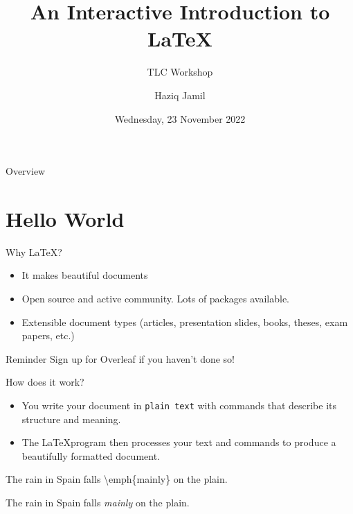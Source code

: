 \documentclass[,aspectratio=43]{beamer}
\author{Haziq Jamil}
\title{An Interactive Introduction to \LaTeX}
\subtitle{TLC Workshop}
\institute{Mathematical Sciences, Faculty of Science, UBD\\
\url{https://haziqj.ml}}
\date{Wednesday, 23 November 2022}
\newenvironment{Shaded}{\begin{snugshade}}{\end{snugshade}}
\newcommand{\FunctionTok}[1]{\textcolor[rgb]{0.02,0.16,0.49}{#1}}
\newcommand{\NormalTok}[1]{#1}
\begin{document}
\begin{frame}
	\titlepage
\end{frame}

\begin{frame}[allowframebreaks=0.8]{Overview}
    \begin{multicols}{2}
  \tableofcontents
  \end{multicols}
  \end{frame}


\hypertarget{hello-world}{%
\section{Hello World}\label{hello-world}}

\begin{frame}{Why \LaTeX?}
\protect\hypertarget{why}{}
\begin{itemize}
\item
  It makes beautiful documents
\item
  Open source and active community. Lots of packages available.
\item
  Extensible document types (articles, presentation slides, books,
  theses, exam papers, etc.)
\end{itemize}

\begin{alertblock}{Reminder}
Sign up for Overleaf if you haven't done so!

\end{alertblock}
\end{frame}

\begin{frame}[fragile]{How does it work?}
\protect\hypertarget{how-does-it-work}{}
\begin{itemize}
\item
  You write your document in \texttt{plain\ text} with commands that
  describe its structure and meaning.
\item
  The \LaTeX program then processes your text and commands to produce a
  beautifully formatted document.
\end{itemize}

\begin{Shaded}
\begin{Highlighting}[]
\NormalTok{The rain in Spain falls }\FunctionTok{\textbackslash{}emph}\NormalTok{\{mainly\} on the plain.}
\end{Highlighting}
\end{Shaded}

\begin{center}
The rain in Spain falls \emph{mainly} on the plain.

\end{center}
\end{frame}
\end{document}
